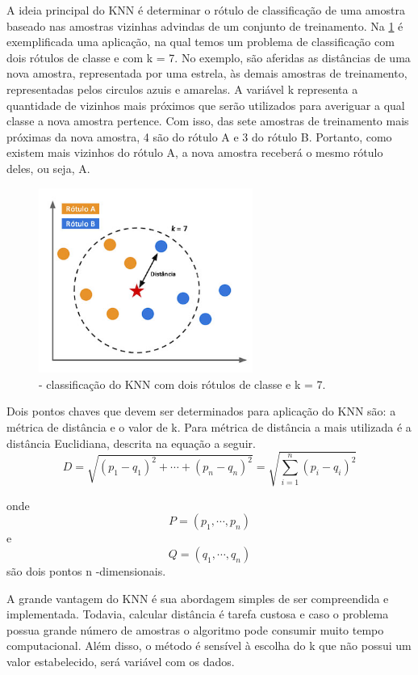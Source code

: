 A ideia principal do KNN é determinar o rótulo de classificação de uma amostra baseado nas amostras vizinhas advindas de um conjunto de treinamento. Na \ref{fig:knn} é exemplificada uma aplicação, na qual temos um problema de classificação com dois rótulos de classe e com k = 7. No exemplo, são aferidas as distâncias de uma nova amostra, representada por uma estrela, às demais amostras de treinamento, representadas pelos circulos azuis e amarelas. A variável k representa a quantidade de vizinhos mais próximos que serão utilizados para averiguar a qual classe a nova amostra pertence. Com isso, das sete amostras de treinamento mais próximas da nova amostra, 4 são do rótulo A e 3 do rótulo B. Portanto, como existem mais vizinhos do rótulo A, a nova amostra receberá o mesmo rótulo deles, ou seja, A.

\begin{figure}[H]
\begin{center}
\includegraphics[width=7cm]{./02_Cap2/figures/imgKnn.png}
\caption{\label{fig:knn}- classificação do KNN com dois rótulos de classe e k = 7.}
\end{center}
\end{figure}

Dois pontos chaves que devem ser determinados para aplicação do KNN são: a métrica de distância e o valor de k. Para métrica de distância a mais utilizada é a distância Euclidiana, descrita na equação a seguir.
\begin{equation}
 D = \sqrt{(p_1 - q_1)^2 + \cdots + (p_n - q_n)^2} = \sqrt{\sum_{i=1}^n (p_i - q_i)^2}
 \end{equation}

onde $$P = (p_1, \cdots, p_n)$$  e $$Q = (q_1, \cdots, q_n)$$ são dois pontos n -dimensionais. 

A grande vantagem do KNN é sua abordagem simples de ser compreendida e implementada. Todavia, calcular distância é tarefa custosa e caso o problema possua grande número de amostras o algoritmo pode consumir muito tempo computacional. Além disso, o método é sensível à escolha do k que não possui um valor estabelecido, será variável com os dados\cite{knn}. 



